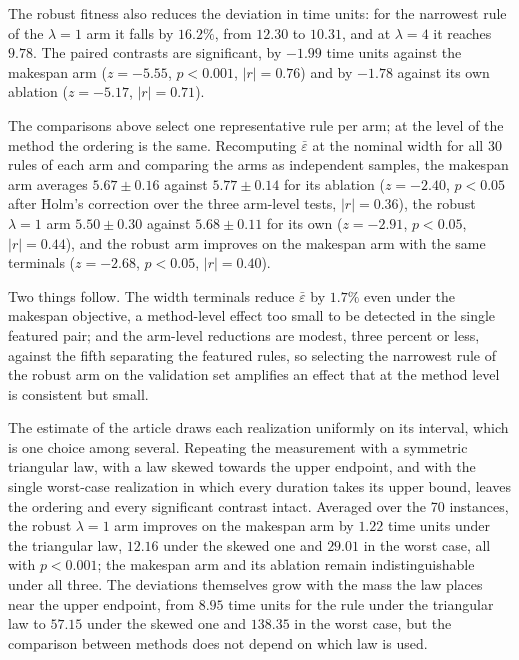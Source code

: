 \documentclass[11pt]{article}
\begin{document}
The robust fitness also reduces the deviation in time units: for the
narrowest rule of the $\lambda{=}1$ arm it falls by $16.2\%$, from
$12.30$ to $10.31$, and at $\lambda{=}4$ it reaches $9.78$. The paired
contrasts are significant, by $-1.99$ time units against the makespan
arm ($z=-5.55$, $p<0.001$, $|r|=0.76$) and by $-1.78$ against its own
ablation ($z=-5.17$, $|r|=0.71$).

The comparisons above select one representative rule per arm; at the
level of the method the ordering is the same. Recomputing
$\bar\varepsilon$ at the nominal width for all 30 rules of each arm
and comparing the arms as independent samples, the makespan arm averages
$5.67 \pm 0.16$ against $5.77 \pm 0.14$ for its ablation
($z=-2.40$, $p<0.05$ after Holm's correction over the three
arm-level tests, $|r|=0.36$), the robust $\lambda{=}1$ arm
$5.50 \pm 0.30$ against $5.68 \pm 0.11$ for its own ($z=-2.91$,
$p<0.05$, $|r|=0.44$), and the robust arm improves on the
makespan arm with the same terminals ($z=-2.68$, $p<0.05$,
$|r|=0.40$).

Two things follow. The width terminals reduce
$\bar\varepsilon$ by $1.7\%$ even under the makespan objective, a method-level effect too small to be detected in the single featured pair; and
the arm-level reductions are modest, three percent or less, against the
fifth separating the featured rules, so selecting the narrowest rule of
the robust arm on the validation set amplifies an effect that at the method level is
consistent but small.

The estimate of the article draws each realization uniformly on its
interval, which is one choice among several. Repeating the measurement
with a symmetric triangular law, with a law skewed towards the upper
endpoint, and with the single worst-case realization in which every
duration takes its upper bound, leaves the ordering and every
significant contrast intact. Averaged over the 70 instances, the robust
$\lambda{=}1$ arm improves on the makespan arm by $1.22$ time units
under the triangular law, $12.16$ under the skewed one and $29.01$ in
the worst case, all with $p<0.001$; the makespan arm and its ablation
remain indistinguishable under all three. The deviations themselves
grow with the mass the law places near the upper endpoint, from $8.95$
time units for the rule under the triangular law to $57.15$ under the
skewed one and $138.35$ in the worst case, but the comparison between
methods does not depend on which law is used.
\end{document}
